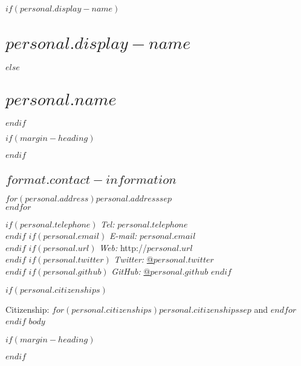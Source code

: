 \documentclass[%
  $if(papersize)$
    $papersize$paper,
  $endif$
  $typesize$,
  oneside
  ]{memoir}
\let\oldsection\section
\renewcommand{\section}[1]{%
  \oldsection{#1}
  \leavevmode
  \par
  \vspace{\dimexpr-\baselineskip-\parskip}
}
\begin{document}
  $if(personal.display-name)$
    \chapter*{$personal.display-name$}
  $else$
    \chapter*{$personal.name$}
  $endif$

$if(margin-heading)$
  \begin{adjustwidth*}{9em}{0em}
  \mbox{}
$endif$

  \hypertarget{contact-information}{%
  \section{$format.contact-information$}\label{contact-information}}
    \begin{minipage}[t]{0.3\textwidth}
      $for(personal.address)$$personal.address$$sep$\\ $endfor$
    \end{minipage}
    \begin{minipage}[t]{0.7\textwidth}
        $if(personal.telephone)$
        {\textit{Tel:}} $personal.telephone$ \\
        $endif$
        $if(personal.email)$
        {\textit{E-mail:}} $personal.email$ \\
        $endif$
        $if(personal.url)$
        {\textit{Web:}} http://$personal.url$ \\
        $endif$
        $if(personal.twitter)$
        {\textit{Twitter:}} \href{http://twitter.com/$personal.twitter$}{@$personal.twitter$} \\
        $endif$
        $if(personal.github)$
        {\textit{GitHub:}} \href{http://github.com/$personal.github$}{@$personal.github$}
        $endif$
    \end{minipage}
  $if(personal.citizenships)$
    \medskip%
    \par Citizenship:
    $for(personal.citizenships)$$personal.citizenships$$sep$ and $endfor$
  $endif$
$body$

$if(margin-heading)$
  \end{adjustwidth*}
$endif$
\end{document}
